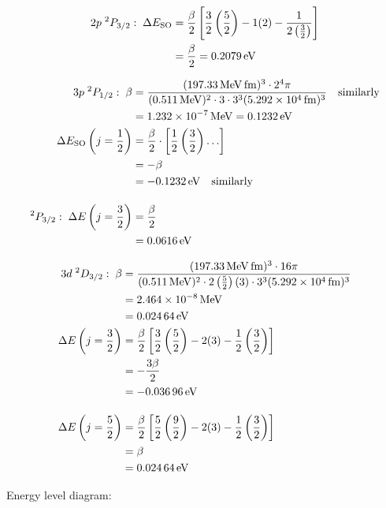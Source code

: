 \begin{parts}
	\begin{align*}
		2p \; {}^2 P_{3/2}: \; \Delta E_\textnormal{SO} &= \frac{\beta}{2} \left[\frac{3}{2}\left(\frac{5}{2}\right) - 1(2) - \frac{1}{2\left(\frac{3}{2}\right)}\right] \\
		&= \frac{\beta}{2} = \SI{0.2079}{\electronvolt}
	\end{align*}
	
	\begin{align*}
		3p \; {}^2 P_{1/2}: \; \beta &= \frac{(\SI{197.33}{\mega\electronvolt\femto\metre})^3 \cdot 2^4 \pi}{(\SI{0.511}{\mega\electronvolt})^2 \cdot 3 \cdot 3^3 (\SI{5.292e4}{\femto\metre})^3} \mtext{similarly} \\
		&= \SI{1.232e-7}{\mega\electronvolt} = \SI{0.1232}{\electronvolt} \\
		\Delta E_\textnormal{SO}\rbracket{j=\frac{1}{2}} &= \frac{\beta}{2} \cdot \sbracket{\frac{1}{2}\rbracket{\frac{3}{2}}\ldots} \\
		&= -\beta \\
		&= \SI{-0.1232}{\electronvolt} \mtext{similarly} \\[1em]
		{}^2 P_{3/2}: \; \Delta E\rbracket{j=\frac{3}{2}} &= \frac{\beta}{2} \\
		&= \SI{0.0616}{\electronvolt}
	\end{align*}
	
	\begin{align*}
		3d \; {}^2 D_{3/2}: \; \beta &= \frac{(\SI{197.33}{\mega\electronvolt\femto\metre})^3 \cdot 16 \pi}{(\SI{0.511}{\mega\electronvolt})^2 \cdot 2 \rbracket{\frac{5}{2}} (3) \cdot 3^3 (\SI{5.292e4}{\femto\metre})^3} \\
		&= \SI{2.464e-8}{\mega\electronvolt} \\
		&= \SI{0.02464}{\electronvolt} \\
		\Delta E\rbracket{j=\frac{3}{2}} &= \frac{\beta}{2} \sbracket{\frac{3}{2}\rbracket{\frac{5}{2}} - 2(3) - \frac{1}{2}\rbracket{\frac{3}{2}}} \\
		&= -\frac{3\beta}{2} \\
		&= \SI{-0.03696}{\electronvolt} \\[1em]
		\Delta E\rbracket{j=\frac{5}{2}} &= \frac{\beta}{2} \sbracket{\frac{5}{2}\rbracket{\frac{9}{2}} - 2(3) - \frac{1}{2}\rbracket{\frac{3}{2}}} \\
		&= \beta \\
		&= \SI{0.02464}{\electronvolt}
	\end{align*}
	
	\newpage
	Energy level diagram:
	

\end{parts}
